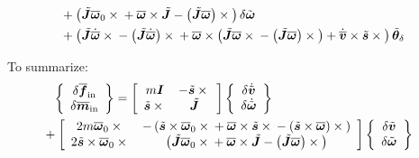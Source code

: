 \documentclass[10pt,fleqn,subeqn]{report}
\newcommand{\T}[1]{\bm{#1}}
\newcommand{\TT}[1]{\bm{#1}}
\begin{document}
\begin{subequations}
\begin{align}
	\nonumber \\ &\hphantom{=}
	+ \plbr{
		\tilde{\TT{J}} \overline{\T{\omega}}_0 \times{}
		+ \overline{\T{\omega}} \times \tilde{\TT{J}}
		- \plbr{\tilde{\TT{J}} \overline{\T{\omega}}} \times{}
	} \delta\tilde{\T{\omega}}
	\nonumber \\ &\hphantom{=}
	+ \plbr{
		\tilde{\TT{J}} \dot{\overline{\T{\omega}}} \times{}
		- \plbr{\tilde{\TT{J}} \dot{\overline{\T{\omega}}}} \times{}
		+ \overline{\T{\omega}} \times \plbr{
			\tilde{\T{J}} \overline{\T{\omega}} \times{}
			- \plbr{\tilde{\TT{J}} \overline{\T{\omega}}} \times{}
		}
		+ \dot{\overline{\T{v}}} \times \tilde{\T{s}} \times{}
	} \tilde{\T{\theta}}_{\delta}
\end{align}
\end{subequations}

To summarize:
\begin{align}
	\cubr{\cvvect{
		\delta\overline{\T{f}}_{\text{in}} \\
		\delta\overline{\T{m}}_{\text{in}} \\
	}} &= \sqbr{\matr{cc}{
		m \TT{I} & -\tilde{\T{s}} \times{} \\
		\tilde{\T{s}} \times{} & \tilde{\TT{J}}
	}} \cubr{\cvvect{
		\delta\dot{\tilde{\T{v}}} \\
		\delta\dot{\tilde{\T{\omega}}}
	}}
	\nonumber \\ & \hspace{-20mm}
	+ \sqbr{\matr{cc}{
		2 m \overline{\T{\omega}}_0 \times{}
		& - \plbr{
			\tilde{\T{s}} \times \overline{\T{\omega}}_0 \times{}
			+ \overline{\T{\omega}} \times \tilde{\T{s}} \times{}
			- \plbr{\tilde{\T{s}} \times \overline{\T{\omega}}} \times{}
		} \\
		2 \tilde{\T{s}} \times \overline{\T{\omega}}_0 \times{}
		& \plbr{
			\tilde{\TT{J}} \overline{\T{\omega}}_0 \times{}
			+ \overline{\T{\omega}} \times \tilde{\TT{J}}
			- \plbr{\tilde{\TT{J}} \overline{\T{\omega}}} \times{}
		}
	}} \cubr{\cvvect{
		\delta\tilde{\T{v}} \\
		\delta\tilde{\T{\omega}}
	}}

\end{align}
\end{document}
